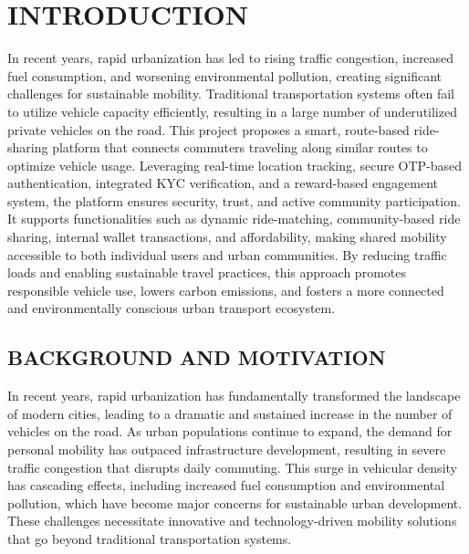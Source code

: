 \documentclass[10pt,a4paper]{report}
\begin{document}
\pagestyle{fancy}
\fancyhf{}

\newpage
{}
\renewcommand{\baselinestretch}{1.50}
\renewcommand{\headrulewidth}{1pt}
\renewcommand{\footrulewidth}{1pt}

\renewcommand{\bibname}{References}
\setcounter{page}{3}
\chapterfont{\centering}







\chapter{INTRODUCTION}

\thispagestyle{fancy}


\large\justify In recent years, rapid urbanization has led to rising traffic congestion, increased fuel consumption, and worsening environmental pollution, creating significant challenges for sustainable mobility. Traditional transportation systems often fail to utilize vehicle capacity efficiently, resulting in a large number of underutilized private vehicles on the road. This project proposes a smart, route-based ride-sharing platform that connects commuters traveling along similar routes to optimize vehicle usage. Leveraging real-time location tracking, secure OTP-based authentication, integrated KYC verification, and a reward-based engagement system, the platform ensures security, trust, and active community participation. It supports functionalities such as dynamic ride-matching, community-based ride sharing, internal wallet transactions, and affordability, making shared mobility accessible to both individual users and urban communities. By reducing traffic loads and enabling sustainable travel practices, this approach promotes responsible vehicle use, lowers carbon emissions, and fosters a more connected and environmentally conscious urban transport ecosystem.

\section{\textbf{BACKGROUND AND MOTIVATION}}
\large\justify In recent years, rapid urbanization has fundamentally transformed the landscape of modern cities, leading to a dramatic and sustained increase in the number of vehicles on the road. As urban populations continue to expand, the demand for personal mobility has outpaced infrastructure development, resulting in severe traffic congestion that disrupts daily commuting. This surge in vehicular density has cascading effects, including increased fuel consumption and environmental pollution, which have become major concerns for sustainable urban development. These challenges necessitate innovative and technology-driven mobility solutions that go beyond traditional transportation systems.
\end{document}
